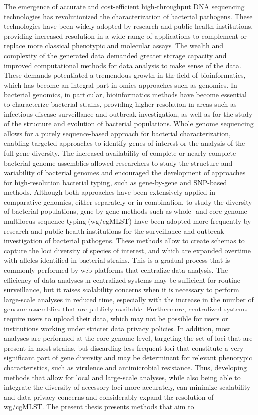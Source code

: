 

The emergence of accurate and cost-efficient high-throughput DNA sequencing technologies has revolutionized the characterization of bacterial pathogens. These technologies have been widely adopted by research and public health institutions, providing increased resolution in a wide range of applications to complement or replace more classical phenotypic and molecular assays. The wealth and complexity of the generated data demanded greater storage capacity and improved computational methods for data analysis to make sense of the data. These demands potentiated a tremendous growth in the field of bioinformatics, which has become an integral part in omics approaches such as genomics. In bacterial genomics, in particular, bioinformatics methods have become essential to characterize bacterial strains, providing higher resolution in areas such as infectious disease surveillance and outbreak investigation, as well as for the study of the structure and evolution of bacterial populations. Whole genome sequencing allows for a purely sequence-based approach for bacterial characterization, enabling targeted approaches to identify genes of interest or the analysis of the full gene diversity. The increased availability of complete or nearly complete bacterial genome assemblies allowed researchers to study the structure and variability of bacterial genomes and encouraged the development of approaches for high-resolution bacterial typing, such as gene-by-gene and SNP-based methods. Although both approaches have been extensively applied in comparative genomics, either separately or in combination, to study the diversity of bacterial populations, gene-by-gene methods such as whole- and core-genome multilocus sequence typing (wg/cgMLST) have been adopted more frequently by research and public health institutions for the surveillance and outbreak investigation of bacterial pathogens. These methods allow to create schemas to capture the loci diversity of species of interest, and which are expanded overtime with alleles identified in bacterial strains. This is a gradual process that is commonly performed by web platforms that centralize data analysis. The efficiency of data analyses in centralized systems may be sufficient for routine surveillance, but it raises scalability concerns when it is necessary to perform large-scale analyses in reduced time, especially with the increase in the number of genome assemblies that are publicly available. Furthermore, centralized systems require users to upload their data, which may not be possible for users or institutions working under stricter data privacy policies. In addition, most analyses are performed at the core genome level, targeting the set of loci that are present in most strains, but discarding less frequent loci that constitute a very significant part of gene diversity and may be determinant for relevant phenotypic characteristics, such as virulence and antimicrobial resistance. Thus, developing methods that allow for local and large-scale analyses, while also being able to integrate the diversity of accessory loci more accurately, can minimize scalability and data privacy concerns and considerably expand the resolution of wg/cgMLST. The present thesis presents methods that aim to 